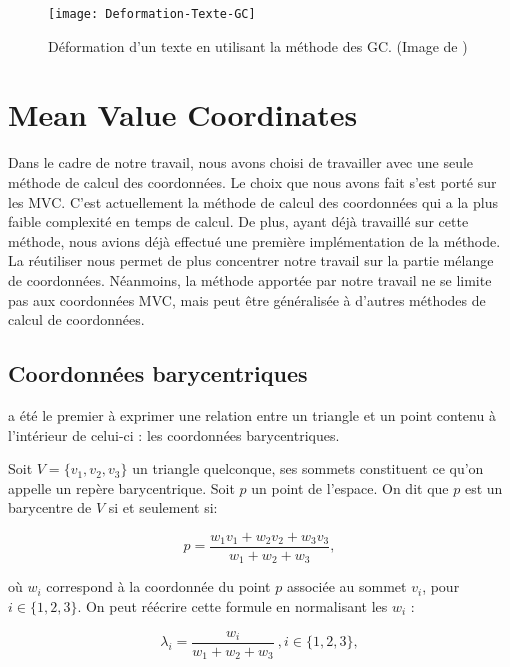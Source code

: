 \begin{figure}[ht]
\begin{center}
\texttt{[image: Deformation-Texte-GC]}

\caption[Déformation d'un texte (GC)] {Déformation d'un texte en utilisant la
méthode des GC. (Image de \cite{LLC08})}

\label{DEFGre}
\end{center}
\end{figure}

\section{Mean Value Coordinates}

Dans le cadre de notre travail, nous avons choisi de travailler avec une seule
méthode de calcul des coordonnées. Le choix que nous avons fait s'est porté
sur les MVC. C'est actuellement la méthode de calcul des coordonnées qui a la
plus faible complexité en temps de calcul. De plus, ayant déjà travaillé sur
cette méthode, nous avions déjà effectué une première implémentation de la
méthode. La réutiliser nous permet de plus concentrer notre travail sur la
partie mélange de coordonnées. Néanmoins, la méthode apportée par notre
travail ne se limite pas aux coordonnées MVC, mais peut être généralisée à
d'autres méthodes de calcul de coordonnées.

\subsection{Coordonnées barycentriques}

\cite{Mob27} a été le premier à exprimer une relation entre un triangle et un
point contenu à l'intérieur de celui-ci : les coordonnées barycentriques.

Soit $V = \{v_1, v_2, v_3\}$ un triangle quelconque, ses sommets constituent ce
qu'on appelle un repère barycentrique. Soit $p$ un point de l'espace. On dit
que $p$ est un barycentre de $V$ si et seulement si:

\begin{equation}
  p = \frac{w_1 v_1 + w_2 v_2 + w_3 v_3}{w_1+w_2+w_3},
  \label{DEFPos}
\end{equation}

où $w_i$ correspond à la coordonnée du point $p$ associée au sommet $v_i$,
pour $i \in \{1, 2, 3\}$. On peut réécrire cette formule en normalisant les
$w_i$ :

\begin{equation}
  \lambda_i = \frac{w_i}{w_1+w_2+w_3} ~, i \in \{1, 2, 3\}, 
\end{equation}

